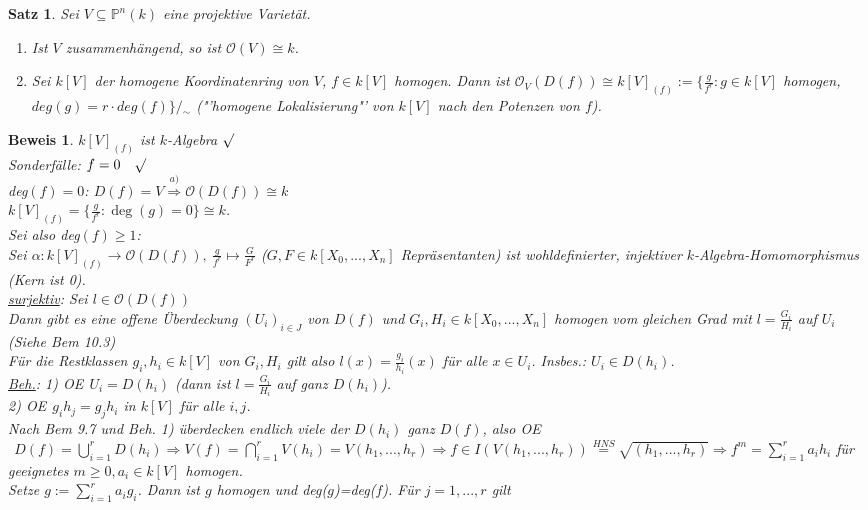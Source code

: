 \documentclass[a4paper,12pt]{report}
\theoremstyle{break}
\newtheorem{Satz}{Satz}
\theoremstyle{nonumberbreak}
\theoremstyle{nonumberplain}
\newtheorem{Bew}{Beweis}
\renewcommand{\OE}{O\!\!E}
\begin{document}
\begin{Satz}
Sei $V\subseteq \mathbb{P}^n(k)$ eine projektive Varietät.\\
\begin{enumerate}
\item Ist $V$ zusammenhängend, so ist $\mathcal{O}(V)\cong k$.\\
\item Sei $k[V]$ der homogene Koordinatenring von $V$, $f\in k[V]$ homogen. Dann ist
$\mathcal{O}_V(D(f))\cong k[V]_{(f)}:= \{\frac{g}{f^r}: g\in k[V]$ homogen, $deg(g)=r\cdot deg(f)\}/\!\!{}_\sim$
("'homogene Lokalisierung"' von $k[V]$ nach den Potenzen von $f$).
\end{enumerate}
\end{Satz}
\begin{Bew} $k[V]_{(f)}$ ist $k$-Algebra $\surd$\\
Sonderfälle: $f=0~~~\surd$\\
deg$(f)=0$: $D(f)=V\stackrel{a)}{\Rightarrow}\mathcal{O}(D(f))\cong k$\\
$k[V]_{(f)}=\{\frac{g}{f^r}: \operatorname{deg}(g)=0\}\cong k$.\\
Sei also deg$(f)\geq 1$:\\
Sei $\alpha: k[V]_{(f)}\rightarrow \mathcal{O}(D(f)),~\frac{g}{f^r}\mapsto\frac{G}{F^r}$ ($G,F\in k[X_0,...,X_n]$ Repräsentanten) ist wohldefinierter, injektiver $k$-Algebra-Homomorphismus (Kern ist 0).\\
\underline{surjektiv}: Sei $l\in\mathcal{O}(D(f))$\\
Dann gibt es eine offene Überdeckung $(U_i)_{i\in J}$ von $D(f)$ und $G_i, H_i\in k[X_0,...,X_n]$ homogen vom gleichen Grad mit $l=\frac{G_i}{H_i}$ auf $U_i$ (Siehe Bem 10.3)\\
Für die Restklassen $g_i, h_i\in k[V]$ von $G_i, H_i$ gilt also $l(x)=\frac{g_i}{h_i}(x)$ für alle $x\in U_i$. Insbes.: $U_i\in D(h_i)$.\\
\underline{Beh.}: 1) \OE $~~U_i=D(h_i)$ (dann ist $l=\frac{G_i}{H_i}$ auf ganz $D(h_i)$).\\
2) \OE $~~g_ih_j=g_jh_i$ in $k[V]$ für alle $i,j$.\\
Nach Bem 9.7 und Beh. 1) überdecken endlich viele der $D(h_i)$ ganz $D(f)$, also \OE $~~D(f)=\bigcup_{i=1}^rD(h_i)\Rightarrow V(f)=\bigcap_{i=1}^rV(h_i)=V(h_1,...,h_r)\Rightarrow f\in I(V(h_1,...,h_r))\stackrel{HNS}{=} \sqrt{(h_1,...,h_r)}\Rightarrow f^m=\sum_{i=1}^ra_ih_i$ für geeignetes $m\geq 0, a_i\in k[V]$ homogen.\\
Setze $g:= \sum_{i=1}^ra_ig_i$. Dann ist $g$ homogen und deg($g$)=deg($f$). Für $j=1,...,r$ gilt

\end{Bew}
\end{document}
